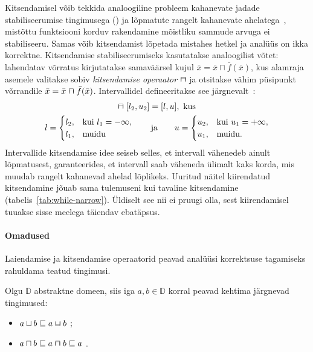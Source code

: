 \documentclass[../thesis.tex]{subfiles}
\begin{document}
Kitsendamisel võib tekkida analoogiline probleem kahanevate jadade stabiliseerumise tingimusega () ja lõpmatute rangelt kahanevate ahelatega~\cite[65]{seidl_foundations}, mistõttu funktsiooni korduv rakendamine mõistliku sammude arvuga ei stabiliseeru. Samas võib kitsendamist lõpetada mistahes hetkel ja analüüs on ikka korrektne. Kitsendamise stabiliseerumiseks kasutatakse analoogilist võtet: lahendatav võrratus kirjutatakse samaväärsel kujul $\bar{x} = \bar{x} \sqcap \bar{f}(\bar{x})$, kus alamraja asemele valitakse sobiv \emph{kitsendamise operaator} $\narrow$ ja otsitakse vähim püsipunkt võrrandile $\bar{x} = \bar{x} \narrow \bar{f}(\bar{x})$. Intervallidel defineeritakse see järgnevalt~\cite[66]{seidl_foundations}:
\begin{gather*}
	[l_1, u_1] \narrow [l_2, u_2] = [l, u], \text{ kus} \\
	l = \begin{cases}
		l_2, & \text{kui } l_1 = -\infty, \\
		l_1, & \text{muidu}
	\end{cases}
	\qquad \text{ja} \qquad
	u = \begin{cases}
		u_2, & \text{kui } u_1 = +\infty, \\
		u_1, & \text{muidu}.
	\end{cases}
\end{gather*}
Intervallide kitsendamise idee seiseb selles, et intervall vähenedeb ainult lõpmatusest, garanteerides, et intervall saab väheneda ülimalt kaks korda, mis muudab rangelt kahanevad ahelad lõplikeks. Uuritud näitel kiirendatud kitsendamine jõuab sama tulemuseni kui tavaline kitsendamine (tabelis~\ref{tab:while-narrow}). Üldiselt see nii ei pruugi olla, sest kiirendamisel tuuakse sisse meelega täiendav ebatäpsus.

\paragraph{Omadused}
Laiendamise ja kitsendamise operaatorid peavad analüüsi korrektsuse tagamiseks rahuldama teatud tingimusi.

\noindent
Olgu $\mathbb{D}$ abstraktne domeen, siis iga $a, b \in \mathbb{D}$ korral peavad kehtima järgnevad tingimused:
\begin{itemize}[nosep]
	\item $a \sqcup b \sqleq a \widen b$ \cite[61]{seidl_foundations};
	\item $a \sqcap b \sqleq a \narrow b \sqleq a$ \cite[66]{seidl_foundations}.
\end{itemize}
\end{document}
